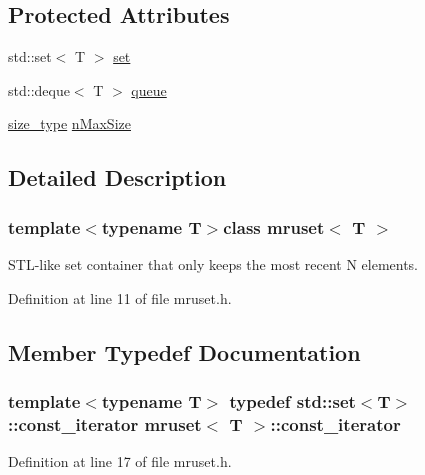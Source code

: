 \subsection*{Protected Attributes}
\begin{DoxyCompactItemize}
\item 
std\+::set$<$ T $>$ \hyperlink{classmruset_a4981fc3556b61600418b2ddad98cc685}{set}
\item 
std\+::deque$<$ T $>$ \hyperlink{classmruset_a6be1fe81dc472e25e160911288373663}{queue}
\item 
\hyperlink{classmruset_aaee46af18d8a5bdc503e9570e499a335}{size\+\_\+type} \hyperlink{classmruset_a6d3d6963e3ca5689e846b12a29dd09ab}{n\+Max\+Size}
\end{DoxyCompactItemize}


\subsection{Detailed Description}
\subsubsection*{template$<$typename T$>$class mruset$<$ T $>$}

S\+T\+L-\/like set container that only keeps the most recent N elements. 

Definition at line 11 of file mruset.\+h.



\subsection{Member Typedef Documentation}
\hypertarget{classmruset_a74c77f7642e8e4db7cc79991c4345692}{}
\subsubsection[{const\+\_\+iterator}]{\setlength{\rightskip}{0pt plus 5cm}template$<$typename T$>$ typedef std\+::set$<$T$>$\+::{\bf const\+\_\+iterator} {\bf mruset}$<$ T $>$\+::{\bf const\+\_\+iterator}}\label{classmruset_a74c77f7642e8e4db7cc79991c4345692}


Definition at line 17 of file mruset.\+h.

\hypertarget{classmruset_a246172eda1afff45be47a013c14b1ad6}{}
